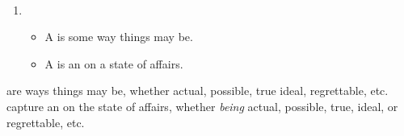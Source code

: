 \begin{note}
  \begin{definition}
    \label{def:prop-val}
    \mbox{ }%
    \vspace{-\baselineskip}
    \begin{enumerate}[noitemsep, label=]
    \item
      \begin{itemize}
      \item
        A \emph{} is some way things may be.
      \item
        A \emph{} is an \agpe{} on a state of affairs.
      \end{itemize}
    \end{enumerate}
    \vspace{-\baselineskip}
  \end{definition}

  \noindent%
   are ways things may be, whether actual, possible, true ideal, regrettable, etc.
   capture an \agpe{} on the state of affairs, whether \emph{being} actual, possible, true, ideal, or regrettable, etc.
\end{note}

\paragraph*{}

